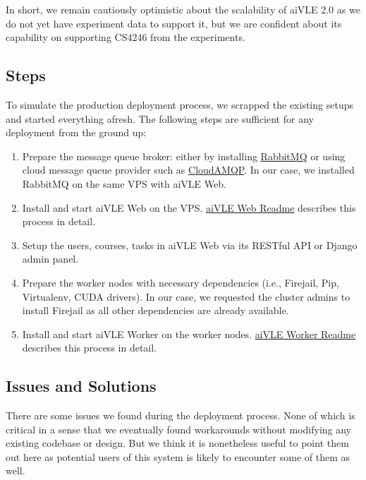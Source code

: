 In short, we remain cautiously optimistic about the scalability of aiVLE 2.0 as we do not yet have experiment data to support it, but we are confident about its capability on supporting CS4246 from the experiments.

\subsection{Steps}
To simulate the production deployment process, we scrapped the existing setups and started everything afresh. The following steps are sufficient for any deployment from the ground up:

\begin{enumerate}
    \item Prepare the message queue broker: either by installing \href{https://www.rabbitmq.com/}{RabbitMQ} or using cloud message queue provider such as \href{https://www.cloudamqp.com/}{CloudAMQP}. In our case, we installed RabbitMQ on the same VPS with aiVLE Web.
    \item Install and start aiVLE Web on the VPS.  \href{https://github.com/edu-ai/aivle-web#readme}{aiVLE Web Readme} describes this process in detail.
    \item Setup the users, courses, tasks in aiVLE Web via its RESTful API or Django admin panel.
    \item Prepare the worker nodes with necessary dependencies (i.e., Firejail, Pip, Virtualenv, CUDA drivers). In our case, we requested the cluster admins to install Firejail as all other dependencies are already available.
    \item Install and start aiVLE Worker on the worker nodes. \href{https://github.com/edu-ai/aivle-worker#readme}{aiVLE Worker Readme} describes this process in detail.
\end{enumerate}

\subsection{Issues and Solutions}
There are some issues we found during the deployment process. None of which is critical in a sense that we eventually found workarounds without modifying any existing codebase or design. But we think it is nonetheless useful to point them out here as potential users of this system is likely to encounter some of them as well.

